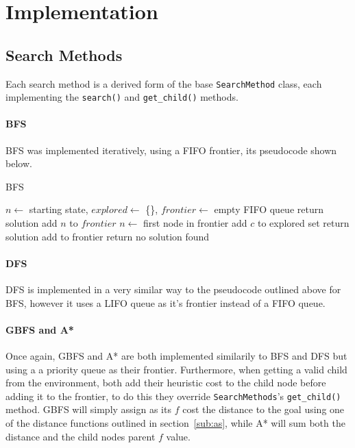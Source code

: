\section{Implementation} %
\label{sec:implementation}

\subsection{Search Methods} %
\label{sub:search_methods}
Each search method is a derived form of the base \texttt{SearchMethod} class, each implementing the \texttt{search()} and \texttt{get_child()} methods.

\paragraph{BFS} %
\label{par:bfs}
BFS was implemented iteratively, using a FIFO frontier, its pseudocode shown below.

\begin{breakablealgorithm}
	\caption{BFS}
	\begin{algorithmic}[1]
			\State $n \gets$ starting state, $explored \gets$ \{\}, $frontier \gets$ empty FIFO queue
				\State return solution
			\EndIf
			\State add $n$ to $frontier$
				\State $n \gets$ first node in frontier
						\State add $c$ to explored set
							\State return solution
						\EndIf
						\State add to frontier
					\EndIf
				\EndFor
			\EndWhile
			\State return no solution found
		\EndProcedure
	\end{algorithmic}
\end{breakablealgorithm}

\paragraph{DFS} %
\label{par:dfs}
DFS is implemented in a very similar way to the pseudocode outlined above for BFS, however it uses a LIFO queue as it's frontier instead of a FIFO queue.

\paragraph{GBFS and A*} %
\label{par:gbfs_and_a_}
Once again, GBFS and A* are both implemented similarily to BFS and DFS but using a a priority queue as their frontier. Furthermore, when getting a valid child from the environment, both add their heuristic cost to the child node before adding it to the frontier, to do this they override \texttt{SearchMethods}'s \texttt{get_child()} method. GBFS will simply assign as its $f$ cost the distance to the goal using one of the distance functions outlined in section~\ref{sub:as}, while A* will sum both the distance and the child nodes parent $f$ value.

